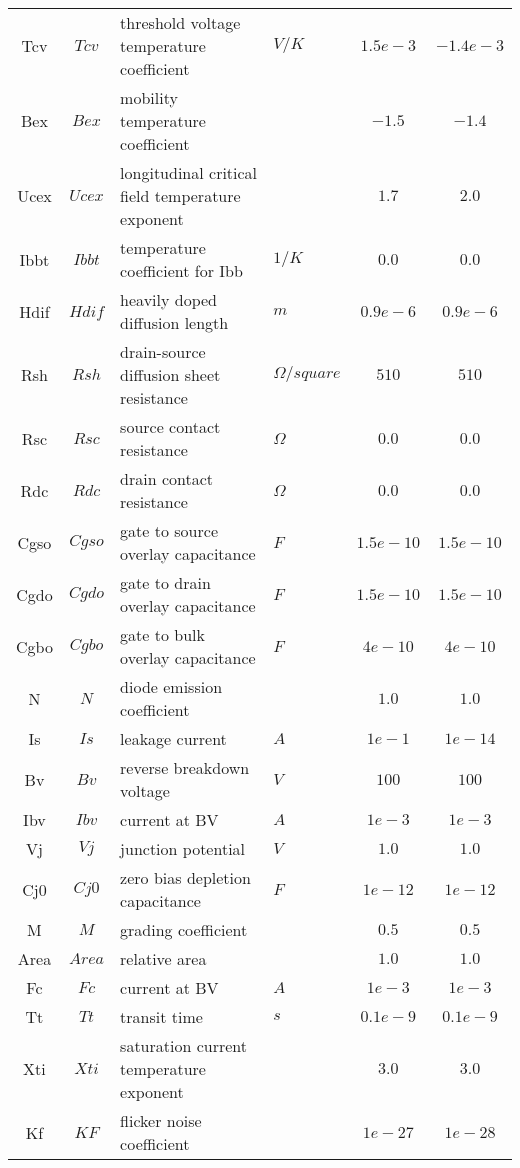 \begin{scriptsize}
\begin{longtable}{ccllcc}
Tcv  & $Tcv$ & threshold voltage temperature coefficient  & $V/K$     & $1.5e-3$ & $-1.4e-3$ \\
Bex & $Bex$ & mobility temperature coefficient  &     & $-1.5$ & $-1.4$ \\
Ucex   & $Ucex$ & longitudinal critical field temperature exponent   & $ $    & $1.7$ & $2.0$ \\
Ibbt  & $Ibbt$ & temperature coefficient for Ibb  & $1/K$     & $0.0$ & $0.0$ \\
Hdif   & $Hdif$ & heavily doped diffusion length   & $m$    & $0.9e-6$ & $0.9e-6$ \\
Rsh & $Rsh$ & drain-source diffusion sheet resistance  &  $\Omega/square$  & $510$ & $510$ \\
Rsc  & $Rsc$ & source contact resistance  & $\Omega$     & $0.0$ & $0.0$ \\
Rdc  & $Rdc$ & drain contact resistance   & $\Omega$    & $0.0$ & $0.0$ \\
Cgso  & $Cgso$ & gate to source overlay capacitance  &  $F$  & $1.5e-10$ & $1.5e-10$ \\
Cgdo  & $Cgdo$ & gate to drain overlay capacitance  &  $F$  & $1.5e-10$ & $1.5e-10$ \\
Cgbo  & $Cgbo$ & gate to bulk overlay capacitance  &  $F$  & $4e-10$ & $4e-10$ \\
N  & $N$ & diode emission coefficient  &    & $1.0$ & $1.0$ \\
Is  & $Is$ & leakage current  & $A$   & $1e-1$ & $1e-14$ \\
Bv  & $Bv$ & reverse breakdown voltage  &  $V$  & $100$ & $100$ \\
Ibv & $Ibv$ & current at BV  &  $A$   & $1e-3$ & $1e-3$ \\
Vj  & $Vj$ & junction potential  & $V$   & $1.0$ & $1.0$ \\
Cj0  & $Cj0$ & zero bias depletion capacitance  &  $F$  & $1e-12$ & $1e-12$ \\
M    & $M$ & grading coefficient  &     & $0.5$ & $0.5$ \\
Area & $Area$ & relative area  &    & $1.0$ & $1.0$ \\
Fc & $Fc$ & current at BV  &  $A$   & $1e-3$ & $1e-3$ \\
Tt  & $Tt$ & transit time  & $s$   & $0.1e-9$ & $0.1e-9$ \\
Xti  & $Xti$ & saturation current temperature exponent  &    & $3.0$ & $3.0$ \\
Kf   & $KF$  & flicker noise coefficient                &    & $1e-27$ & $1e-28$ \\

\end{longtable}
\end{scriptsize}
